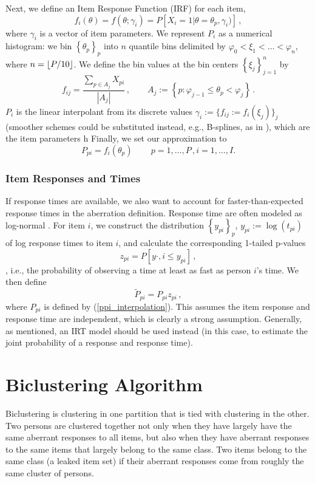 \documentclass{article}
\DeclarePairedDelimiter\floor{\lfloor}{\rfloor}
\newcommand{\ta}{\theta}
\begin{document}
Next, we define an Item Response Function (IRF) for each item,
\begin{equation}
  f_i(\theta) = f(\theta; \gamma_i) = P \left[X_i=1 | \theta=\theta_p, \gamma_i) \right]\,,
\end{equation}
where $\gamma_i$ is a vector of item parameters. We represent $P_i$ as a numerical histogram: we bin $\left\{\theta_p\right\}_p$ into $n$ quantile bins delimited by $\varphi_0 < \xi_1 < \dots < \varphi_n$, where $n = \floor*{P / 10}$. We define the bin values at the bin centers $\left\{\xi_j \right\}_{j=1}^n$ by
\begin{equation}
	\label{histogram_const}
	f_{ij} = \frac{\sum_{p \in A_j} X_{pi}}{|A_j|}\,,\qquad
	A_j := \left\{ p : \varphi_{j-1} \leq \ta_p < \varphi_j \right\}\,.
\end{equation}
$P_i$ is the linear interpolant from its discrete values $\gamma_i := \{f_{ij} := f_i(\xi_j)\}_j$ (smoother schemes could be substituted instead, e.g., B-splines, as in \cite{matt_bsplines}), which are the item parameters h Finally, we set our approximation to
\begin{equation}
	P_{pi} = f_i(\theta_p)\qquad\, p=1,\dots,P\,,i=1,\dots,I.
	\label{ppi_interpolation}
\end{equation}

\subsubsection{Item Responses and Times}
If response times are available, we also want to account for faster-than-expected response times in the aberration definition. Response time are often modeled as log-normal \cite{sandip}. For item $i$, we construct the distribution $\left\{y_{pi}\right\}_p$, $y_{pi} := \log(t_{pi})$ of log response times to item $i$, and calculate the corresponding 1-tailed p-values
$$ z_{pi} = P[y{\cdot,i} \leq y_{pi}]\,, $$,
i.e., the probability of observing a time at least as fast as person $i$'s time. We then define
\begin{equation}
	\tilde{P}_{pi} =  P_{pi} z_{pi}\,,
	\label{ppi_interpolation_time}
\end{equation}
where $P_{pi}$ is defined by (\ref{ppi_interpolation}). This assumes the item response and response time are independent, which is clearly a strong assumption. Generally, as mentioned, an IRT model should be used instead (in this case, to estimate the joint probability of a response and response time).

\section{Biclustering Algorithm}
\label{biclustering}
Biclustering is clustering in one partition that is tied with clustering in the other. Two persons are clustered together not only when they have largely have the same aberrant responses to all items, but also when they have aberrant responses to the same items that largely belong to the same class. Two items belong to the same class (a leaked item set) if their aberrant responses come from roughly the same cluster of persons.
\end{document}
